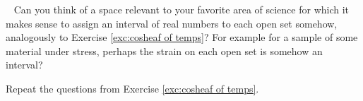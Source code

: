 \begin{exerciseRUS}\label{exc:cosheaf of temps}
\end{exerciseRUS}

\begin{exerciseENG}~
\sexc Can you think of a space relevant to your favorite area of science for which it makes sense to assign an interval of real numbers to each open set somehow, analogously to Exercise \ref{exc:cosheaf of temps}? For example for a sample of some material under stress, perhaps the strain on each open set is somehow an interval? 
\item Repeat the questions from Exercise \ref{exc:cosheaf of temps}.
\endsexc
\end{exerciseENG}

\begin{exerciseRUS}~
\end{exerciseRUS}

